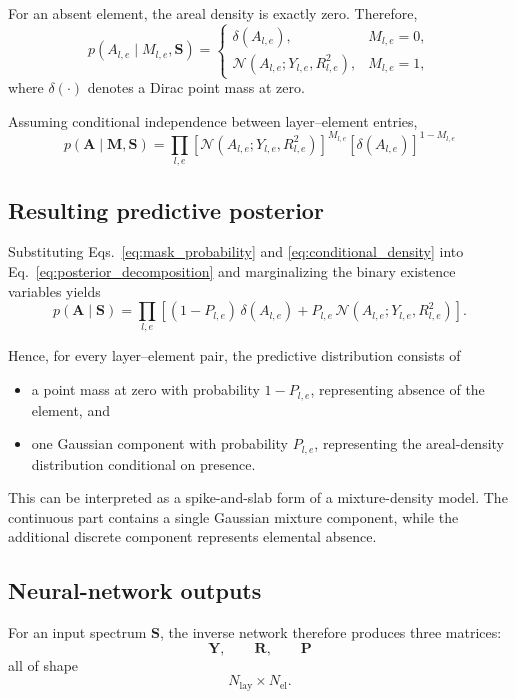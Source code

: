 \documentclass[11pt,a4paper]{article}
\begin{document}
For an absent element, the areal density is exactly zero. Therefore,
\[
p(A_{l,e}\mid M_{l,e},\bm{S})
=
\begin{cases}
\delta(A_{l,e}),
&
M_{l,e}=0,
\\[4pt]
\mathcal{N}
\left(
A_{l,e};
Y_{l,e},
R_{l,e}^{2}
\right),
&
M_{l,e}=1,
\end{cases}
\]
where $\delta(\cdot)$ denotes a Dirac point mass at zero.

Assuming conditional independence between layer--element entries,
\[
\boxed{
p(\bm{A}\mid\bm{M},\bm{S})
=
\prod_{l,e}
\left[
\mathcal{N}
\left(
A_{l,e};
Y_{l,e},
R_{l,e}^{2}
\right)
\right]^{M_{l,e}}
\left[
\delta(A_{l,e})
\right]^{1-M_{l,e}}
}
\label{eq:conditional_density}
\]

\subsection{Resulting predictive posterior}

Substituting Eqs.~\eqref{eq:mask_probability} and
\eqref{eq:conditional_density} into Eq.~\eqref{eq:posterior_decomposition}
and marginalizing the binary existence variables yields
\[
\boxed{
p(\bm{A}\mid\bm{S})
=
\prod_{l,e}
\left[
(1-P_{l,e})\,\delta(A_{l,e})
+
P_{l,e}\,
\mathcal{N}
\left(
A_{l,e};
Y_{l,e},
R_{l,e}^{2}
\right)
\right].
}
\label{eq:final_posterior}
\]

Hence, for every layer--element pair, the predictive distribution consists of
\begin{itemize}
    \item a point mass at zero with probability $1-P_{l,e}$, representing absence of the element, and
    \item one Gaussian component with probability $P_{l,e}$, representing the areal-density distribution conditional on presence.
\end{itemize}

This can be interpreted as a spike-and-slab form of a mixture-density model. The continuous part contains a single Gaussian mixture component, while the additional discrete component represents elemental absence.

\subsection{Neural-network outputs}

For an input spectrum $\bm{S}$, the inverse network therefore produces three matrices:
\[
\boxed{
\bm{Y},\qquad
\bm{R},\qquad
\bm{P}
}
\]
all of shape
\[
N_{\mathrm{lay}}\times N_{\mathrm{el}}.
\]
\end{document}
